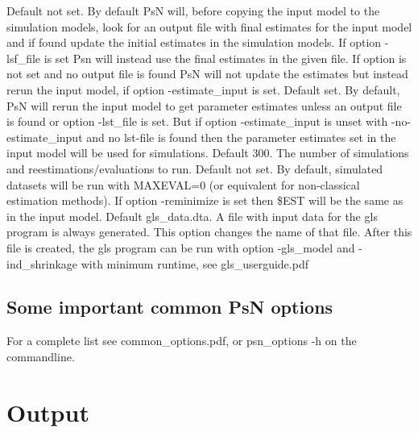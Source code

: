 \begin{optionlist}
Default not set. By default PsN will, before copying the input model to the simulation models, look for an output file with final estimates for the input model and if found update the initial estimates in the simulation models. If option -lsf\_file is set Psn will instead use the final estimates in the given file. If option is not set and no output file is found PsN will not update the estimates but instead rerun the input model, if option -estimate\_input is set. 
\nextopt
{}
Default set. By default, PsN will rerun the input model to get parameter estimates unless an output file is found or option -lst\_file is set. But if option -estimate\_input is unset with -no-estimate\_input and no lst-file is found then the parameter estimates set in the input model will be used for simulations. 
\nextopt
{}
Default 300. The number of simulations and reestimations/evaluations to run. 
\nextopt
{}
Default not set. By default, simulated datasets will be run with MAXEVAL=0 (or equivalent for non-classical estimation methods). If option -reminimize is set then \$EST will be the same as in the input model. 
\nextopt
{}
Default gls\_data.dta. A file with input data for the gls program is always generated. This option changes the name of that file. After this file is created, the gls program can be run with option \mbox{-gls\_model} and -ind\_shrinkage with minimum runtime, see gls\_userguide.pdf 
\nextopt
\end{optionlist}

\subsection{Some important common PsN options}
For a complete list see common\_options.pdf, 
or psn\_options -h on the commandline.




\section{Output}


